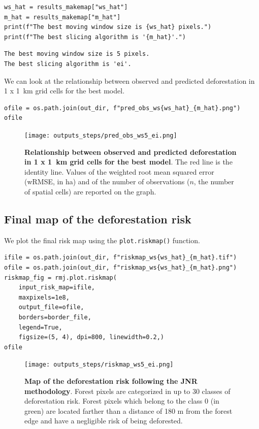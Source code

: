 \documentclass[paper=a4, 12pt, DIV=12]{scrartcl}
\begin{document}
\begin{verbatim}
ws_hat = results_makemap["ws_hat"]
m_hat = results_makemap["m_hat"]
print(f"The best moving window size is {ws_hat} pixels.")
print(f"The best slicing algorithm is '{m_hat}'.")
\end{verbatim}

\begin{verbatim}
The best moving window size is 5 pixels.
The best slicing algorithm is 'ei'.
\end{verbatim}


We can look at the relationship between observed and predicted deforestation in 1 x 1 km grid cells for the best model.

\begin{verbatim}
ofile = os.path.join(out_dir, f"pred_obs_ws{ws_hat}_{m_hat}.png")
ofile
\end{verbatim}

\begin{figure}[H]
\centering
\texttt{[image: outputs\_steps/pred\_obs\_ws5\_ei.png]}
\caption{\label{fig:orgea2bff9}\textbf{Relationship between observed and predicted deforestation in 1 x 1 km grid cells for the best model}. The red line is the identity line. Values of the weighted root mean squared error (wRMSE, in ha) and of the number of observations (\(n\), the number of spatial cells) are reported on the graph.}
\end{figure}

\subsection{Final map of the deforestation risk}
\label{sec:org0086d2a}

We plot the final risk map using the \texttt{plot.riskmap()} function.

\begin{verbatim}
ifile = os.path.join(out_dir, f"riskmap_ws{ws_hat}_{m_hat}.tif")
ofile = os.path.join(out_dir, f"riskmap_ws{ws_hat}_{m_hat}.png")
riskmap_fig = rmj.plot.riskmap(
    input_risk_map=ifile,
    maxpixels=1e8,
    output_file=ofile,
    borders=border_file,
    legend=True,
    figsize=(5, 4), dpi=800, linewidth=0.2,)
ofile
\end{verbatim}

\begin{figure}[H]
\centering
\texttt{[image: outputs\_steps/riskmap\_ws5\_ei.png]}
\caption{\label{fig:org631534e}\textbf{Map of the deforestation risk following the JNR methodology}. Forest pixels are categorized in up to 30 classes of deforestation risk. Forest pixels which belong to the class 0 (in green) are located farther than a distance of 180 m from the forest edge and have a negligible risk of being deforested.}
\end{figure}
\end{document}
